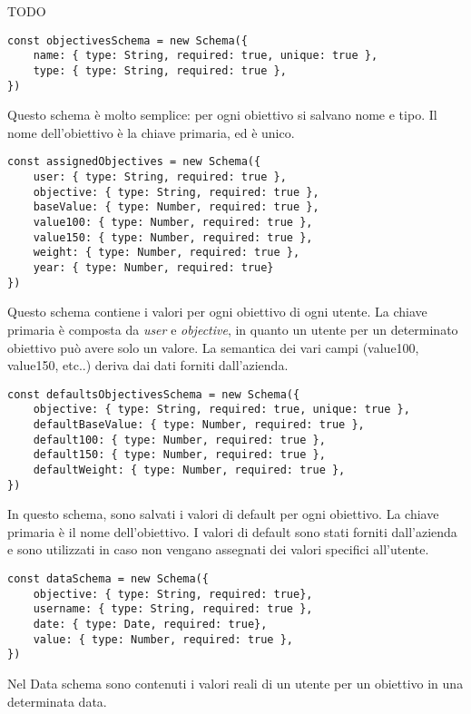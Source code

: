TODO

\begin{verbatim}
const objectivesSchema = new Schema({
    name: { type: String, required: true, unique: true },
    type: { type: String, required: true },
})
\end{verbatim}

Questo schema è molto semplice: per ogni obiettivo si salvano nome e tipo. Il nome dell'obiettivo è la 
chiave primaria, ed è unico.

\begin{verbatim}
const assignedObjectives = new Schema({
    user: { type: String, required: true },
    objective: { type: String, required: true },
    baseValue: { type: Number, required: true },
    value100: { type: Number, required: true },
    value150: { type: Number, required: true },
    weight: { type: Number, required: true },
    year: { type: Number, required: true}
})
\end{verbatim}

Questo schema contiene i valori per ogni obiettivo di ogni utente.
La chiave primaria è composta da \textit{user} e \textit{objective}, in quanto un utente per un determinato 
obiettivo può avere solo un valore. La semantica dei vari campi (value100, value150, etc..) deriva dai dati
forniti dall'azienda.

\begin{verbatim}
const defaultsObjectivesSchema = new Schema({
    objective: { type: String, required: true, unique: true },
    defaultBaseValue: { type: Number, required: true },
    default100: { type: Number, required: true },
    default150: { type: Number, required: true },
    defaultWeight: { type: Number, required: true },
})
\end{verbatim}

In questo schema, sono salvati i valori di default per ogni obiettivo. La chiave primaria è il nome dell'obiettivo.
I valori di default sono stati forniti dall'azienda e sono utilizzati in caso non vengano assegnati dei valori 
specifici all'utente.

\begin{verbatim}
const dataSchema = new Schema({
    objective: { type: String, required: true},
    username: { type: String, required: true },
    date: { type: Date, required: true},
    value: { type: Number, required: true },
})
\end{verbatim}

Nel Data schema sono contenuti i valori reali di un utente per un obiettivo in una determinata data.